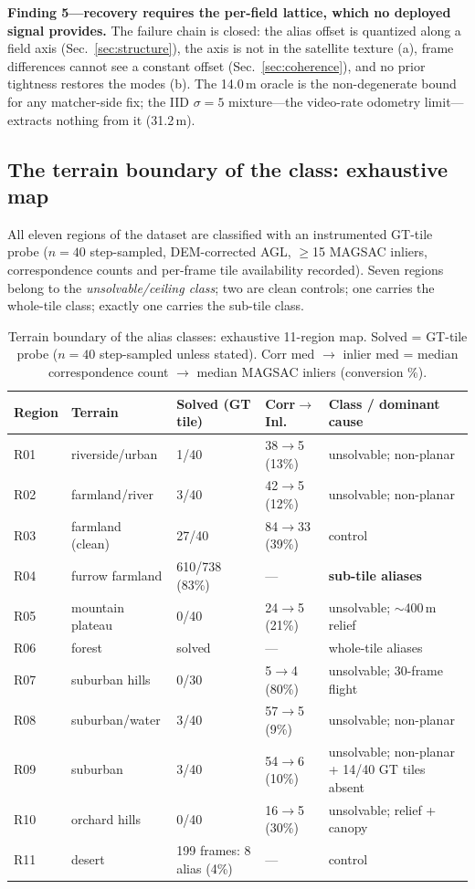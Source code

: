 \documentclass[journal]{IEEEtran}
\begin{document}
\textbf{Finding 5---recovery requires the per-field lattice, which no deployed signal provides.} The failure chain is closed: the alias offset is quantized along a field axis (Sec.~\ref{sec:structure}), the axis is not in the satellite texture (a), frame differences cannot see a constant offset (Sec.~\ref{sec:coherence}), and no prior tightness restores the modes (b). The 14.0\,m oracle is the non-degenerate bound for any matcher-side fix; the IID $\sigma=5$ mixture---the video-rate odometry limit---extracts nothing from it (31.2\,m).

\subsection{The terrain boundary of the class: exhaustive map}
\label{sec:boundary}

All eleven regions of the dataset are classified with an instrumented GT-tile probe ($n=40$ step-sampled, DEM-corrected AGL, $\geq$15 MAGSAC inliers, correspondence counts and per-frame tile availability recorded). Seven regions belong to the \emph{unsolvable/ceiling class}; two are clean controls; one carries the whole-tile class; exactly one carries the sub-tile class.

\begin{table}[t]
\caption{Terrain boundary of the alias classes: exhaustive 11-region map. Solved = GT-tile probe ($n=40$ step-sampled unless stated). Corr med $\to$ inlier med = median correspondence count $\to$ median MAGSAC inliers (conversion \%).}
\label{tab:terrain}
\centering
\footnotesize
\begin{tabular}{@{}lllll@{}}
\toprule
Region & Terrain & Solved (GT tile) & Corr$\to$Inl. & Class / dominant cause \\
\midrule
R01 & riverside/urban & 1/40 & 38$\to$5 (13\%) & unsolvable; non-planar \\
R02 & farmland/river & 3/40 & 42$\to$5 (12\%) & unsolvable; non-planar \\
R03 & farmland (clean) & 27/40 & 84$\to$33 (39\%) & control \\
R04 & furrow farmland & 610/738 (83\%) & --- & \textbf{sub-tile aliases} \\
R05 & mountain plateau & 0/40 & 24$\to$5 (21\%) & unsolvable; $\sim$400\,m relief \\
R06 & forest & solved & --- & whole-tile aliases \\
R07 & suburban hills & 0/30 & 5$\to$4 (80\%) & unsolvable; 30-frame flight \\
R08 & suburban/water & 3/40 & 57$\to$5 (9\%) & unsolvable; non-planar \\
R09 & suburban & 3/40 & 54$\to$6 (10\%) & unsolvable; non-planar + 14/40 GT tiles absent \\
R10 & orchard hills & 0/40 & 16$\to$5 (30\%) & unsolvable; relief + canopy \\
R11 & desert & 199 frames: 8 alias (4\%) & --- & control \\
\bottomrule
\end{tabular}
\end{table}
\end{document}
